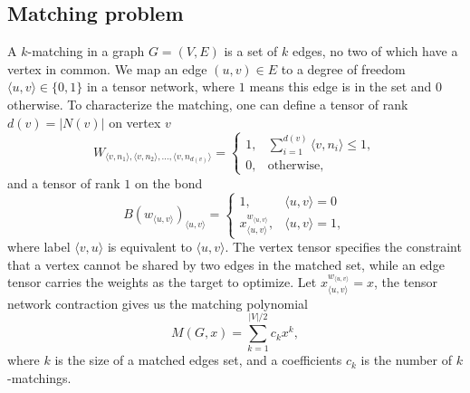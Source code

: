 \documentclass[onefignum, onetabnum]{siamart190516}
\newcommand{\<}{\langle}
\renewcommand{\>}{\rangle}
\begin{document}
\subsection{Matching problem}
A $k$-matching in a graph $G=(V,E)$ is a set of $k$ edges, no two of which have a vertex in common.
We map an edge $(u, v) \in E$ to a degree of freedom $\langle u, v\rangle \in \{0, 1\}$ in a tensor network,
where $1$ means this edge is in the set and $0$ otherwise.
To characterize the matching, one can define a tensor of rank $d(v) = |N(v)|$ on vertex $v$
\begin{equation}
    W_{\langle v, n_1\rangle, \langle v, n_2 \rangle, \ldots, \langle v, n_{d(v)}\rangle} = \begin{cases}
        1, & \sum_{i=1}^{d(v)} \langle v, n_i \rangle \leq 1,\\
        0, & \text{otherwise},
    \end{cases}
\end{equation}
and a tensor of rank $1$ on the bond
\begin{equation}
    B(w_{\langle u,v \rangle})_{\langle u, v\rangle} = \begin{cases}
    1, & \langle u, v \rangle = 0 \\
    x^{w_{\langle u,v \rangle}}_{\langle u, v\rangle}, & \langle u, v \rangle = 1,
\end{cases}
\end{equation}
where label $\langle v, u \rangle$ is equivalent to $\langle u,v\rangle$.
The vertex tensor specifies the constraint that a vertex cannot be shared by two edges in the matched set,
while an edge tensor carries the weights as the target to optimize.
Let $x_{\langle u,v\rangle}^{w_{\langle u,v\rangle}}=x$, the tensor network contraction gives us the matching polynomial
\begin{equation}
    M(G, x) = \sum\limits_{k=1}^{|V|/2} c_k x^k,
\end{equation}
where $k$ is the size of a matched edges set, and a coefficients $c_k$ is the number of $k$-matchings.
\end{document}
